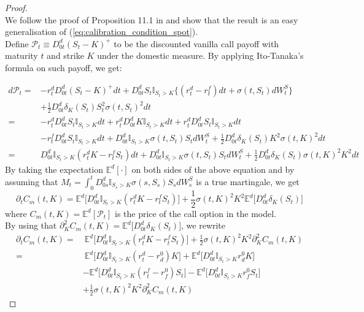 \begin{proof}\ \\
We follow the proof of Proposition 11.1 in \cite{guyonLabordere} and show that the result is an easy generalisation of (\ref{eq:calibration_condition_spot}). \\
Define $\mathcal{P}_t\equiv D^d_{0t}(S_t-K)^+$ to be the discounted vanilla call payoff with maturity $t$ and strike $K$ under the domestic measure. By applying Ito-Tanaka's formula on such payoff, we get:

\begin{align*}
d\mathcal{P}_t  = & - r_t^d D^d_{0t}(S_t-K)^+dt + D^d_{0t}S_t\mathbb{I}_{S_t>K} \{ (r_t^d-r_t^f)dt + \sigma(t,S_t)dW^S_t \}\\
& + \frac{1}{2} D^d_{0t}\delta_K(S_t)S^2_t\sigma(t,S_t)^2dt \\
= &  - r_t^d D^d_{0t}S_t\mathbb{I}_{S_t>K}dt + r_t^d D^d_{0t}K\mathbb{I}_{S_t>K}dt + r_t^d D^d_{0t}S_t\mathbb{I}_{S_t>K}dt\\
&  -r_t^f D^d_{0t}S_t\mathbb{I}_{S_t>K}dt + D^d_{0t}\mathbb{I}_{S_t>K}\sigma(t,S_t)S_tdW^S_t+ \frac{1}{2} D^d_{0t}\delta_K(S_t)K^2\sigma(t,K)^2dt\\
= & D^d_{0t}\mathbb{I}_{S_t>K}(r_t^d K- r_t^f S_t)dt +  D^d_{0t}\mathbb{I}_{S_t>K}\sigma(t,S_t)S_tdW^S_t 
+ \frac{1}{2} D^d_{0t}\delta_K(S_t)\sigma(t,K)^2K^2 dt
\end{align*}
By taking the expectation $\mathbb{E}^d[\cdot]$ on both sides of the above equation and by assuming that $ M_t =\int_0^tD^d_{0s}\mathbb{I}_{S_s>K}\sigma(s,S_s)S_s dW^S_s$ is a true martingale, we get
$$ \partial_tC_m(t,K)= \mathbb{E}^d\big[ D^d_{0t}\mathbb{I}_{S_t>K}(r_t^d K- r_t^f S_t) \big] + \frac{1}{2}\sigma(t,K)^2K^2 \mathbb{E}^d\big[ D^d_{0t}\delta_K(S_t) \big]$$
where $C_m(t,K)= \mathbb{E}^d[\mathcal{P}_t]$ is the price of the call option in the model.\\
By using that $\partial_K^2C_m(t,K)= \mathbb{E}^d\big[ D^d_{0t}\delta_K(S_t) \big] $, we rewrite
\begin{align*}
\partial_tC_m(t,K) = &\ \mathbb{E}^d\big[ D^d_{0t}\mathbb{I}_{S_t>K}(r_t^d K- r_t^f S_t) \big] + \frac{1}{2}\sigma(t,K)^2K^2\partial_K^2C_m(t,K)\\
= &\ \mathbb{E}^d\big[ D^d_{0t}\mathbb{I}_{S_t>K}(r_t^d - r_d^0 )K \big] + \mathbb{E}^d\big[ D^d_{0t}\mathbb{I}_{S_t>K} r_d^0 K \big] \\
&-\mathbb{E}^d\big[ D^d_{0t}\mathbb{I}_{S_t>K}(r_t^f - r_f^0 )S_t \big] - \mathbb{E}^d\big[ D^d_{0t}\mathbb{I}_{S_t>K} r_f^0 S_t \big]\\
& + \frac{1}{2}\sigma(t,K)^2K^2\partial_K^2C_m(t,K)
\end{align*}


\end{proof}
